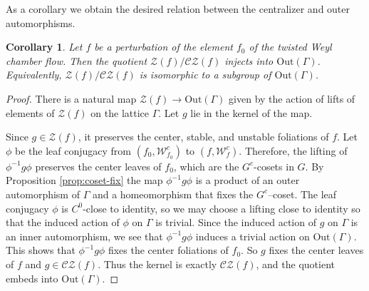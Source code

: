 \documentclass[11pt]{amsart}
\numberwithin{equation}{section}
\newcommand{\W}{\mathcal{W}}
\newcommand{\CZ}{\mathcal{CZ}}
\theoremstyle{plain}
\newtheorem{cor}[thm]{Corollary}
\begin{document}
As a corollary we obtain the desired relation between the centralizer and
outer automorphisms.

\begin{cor}
Let $f$ be a perturbation of the element $f_0$ of the twisted Weyl
chamber flow. Then the quotient
$\mathcal Z(f)/\CZ(f)$ injects into $\mathrm{Out}(\Gamma)$. Equivalently,
$\mathcal Z(f)/\CZ(f)$ is isomorphic to a subgroup of
$\mathrm{Out}(\Gamma)$.
\end{cor}

\begin{proof} There is a natural map $\mathcal Z(f ) \to \mathrm{Out}(\Gamma)$ given by the action of lifts
of elements of $\mathcal Z(f)$ on the lattice $\Gamma$. Let $g$ lie in the kernel of the map.

Since $g\in \mathcal Z(f)$, it preserves the center, stable, and unstable foliations of $f$. Let $\phi$ be the leaf conjugacy from $(f_0,\W^c_{f_0})$ to $(f,\W^c_f)$. Therefore, the
lifting of $\phi^{-1} g\phi$ preserves the center leaves of $f_0$, which are
the $G^c$-cosets in $G$. By Proposition \ref{prop:coset-fix} the map
$\phi^{-1} g\phi$ is a product of an outer automorphism of $\Gamma$ and a homeomorphism that fixes the  $G^c$--coset. The leaf conjugacy $\phi$ is $C^0$-close to identity, so we may choose a lifting close to identity so that the induced action of $\phi$ on $\Gamma$ is trivial. Since the induced action of $g$ on $\Gamma$ is an inner automorphism, we see that $\phi^{-1} g\phi$ induces a trivial action on $\mathrm{Out}(\Gamma)$. This shows that $\phi^{-1} g\phi$ fixes the center foliations of $f_0$. So $g$ fixes the center leaves of $f$ and $g\in\CZ(f)$. Thus the kernel is exactly
$\CZ(f)$, and the quotient embeds into $\mathrm{Out}(\Gamma)$.
\end{proof}
\end{document}
